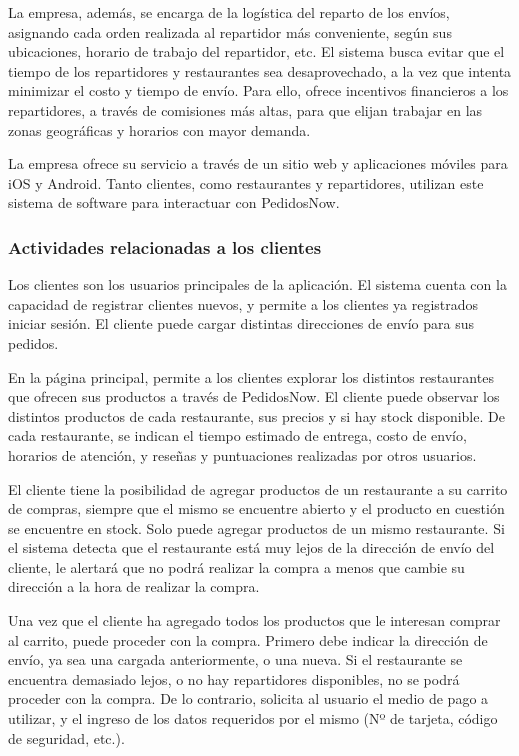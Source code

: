 La empresa, además, se encarga de la logística del reparto de los envíos, asignando cada orden realizada al repartidor más conveniente, según sus ubicaciones, horario de trabajo del repartidor, etc. El sistema busca evitar que el tiempo de los repartidores y restaurantes sea desaprovechado, a la vez que intenta minimizar el costo y tiempo de envío. Para ello, ofrece incentivos financieros a los repartidores, a través de comisiones más altas, para que elijan trabajar en las zonas geográficas y horarios con mayor demanda.

La empresa ofrece su servicio a través de un sitio web y aplicaciones móviles para iOS y Android. Tanto clientes, como restaurantes y repartidores, utilizan este sistema de software para interactuar con PedidosNow.

\subsubsection{Actividades relacionadas a los clientes}

Los clientes son los usuarios principales de la aplicación. El sistema cuenta con la capacidad de registrar clientes nuevos, y permite a los clientes ya registrados iniciar sesión. El cliente puede cargar distintas direcciones de envío para sus pedidos.

En la página principal, permite a los clientes explorar los distintos restaurantes que ofrecen sus productos a través de PedidosNow. El cliente puede observar los distintos productos de cada restaurante, sus precios y si hay stock disponible. De cada restaurante, se indican el tiempo estimado de entrega, costo de envío, horarios de atención, y reseñas y puntuaciones realizadas por otros usuarios.

El cliente tiene la posibilidad de agregar productos de un restaurante a su carrito de compras, siempre que el mismo se encuentre abierto y el producto en cuestión se encuentre en stock. Solo puede agregar productos de un mismo restaurante. Si el sistema detecta que el restaurante está muy lejos de la dirección de envío del cliente, le alertará que no podrá realizar la compra a menos que cambie su dirección a la hora de realizar la compra.

Una vez que el cliente ha agregado todos los productos que le interesan comprar al carrito, puede proceder con la compra. Primero debe indicar la dirección de envío, ya sea una cargada anteriormente, o una nueva. Si el restaurante se encuentra demasiado lejos, o no hay repartidores disponibles, no se podrá proceder con la compra. De lo contrario, solicita al usuario el medio de pago a utilizar, y el ingreso de los datos requeridos por el mismo (Nº de tarjeta, código de seguridad, etc.).

